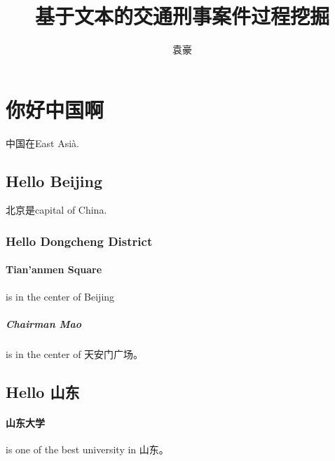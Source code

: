 \documentclass[a4paper, UTF8, 11pt, twocolumn]{ctexart}
\title{基于文本的交通刑事案件过程挖掘}
\author{袁豪}
\begin{document}
\maketitle
\section{你好中国啊}
中国在East Asi\`a.
\subsection{Hello Beijing}
北京是capital of China.
\subsubsection{Hello Dongcheng District}
\paragraph{Tian'anmen Square}
is in the center of Beijing
\subparagraph{Chairman Mao}
is in the center of 天安门广场。
\subsection{Hello 山东}
\paragraph{山东大学} is one of the best university in 山东。
\end{document}
